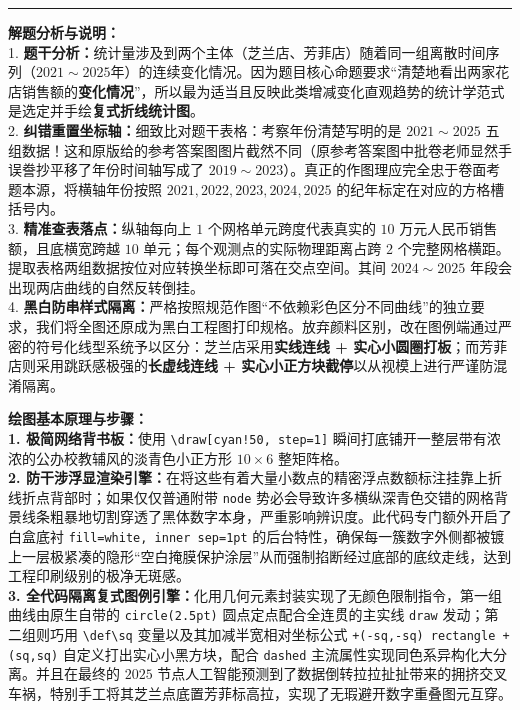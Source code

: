 \vspace{0.6cm}
\hrule
\vspace{0.4cm}

{\small\color{gray}
\textbf{解题分析与说明：}\\
1. \textbf{题干分析：}统计量涉及到两个主体（芝兰店、芳菲店）随着同一组离散时间序列（$2021\sim 2025$年）的连续变化情况。因为题目核心命题要求“清楚地看出两家花店销售额的\textbf{变化情况}”，所以最为适当且反映此类增减变化直观趋势的统计学范式是选定并手绘\textbf{复式折线统计图}。\\
2. \textbf{纠错重置坐标轴：}细致比对题干表格：考察年份清楚写明的是 $2021\sim 2025$ 五组数据！这和原版给的参考答案图图片截然不同（原参考答案图中批卷老师显然手误誊抄平移了年份时间轴写成了 $2019\sim 2023$）。真正的作图理应完全忠于卷面考题本源，将横轴年份按照 $2021, 2022, 2023, 2024, 2025$ 的纪年标定在对应的方格槽括号内。\\
3. \textbf{精准查表落点：}纵轴每向上 $1$ 个网格单元跨度代表真实的 $10$ 万元人民币销售额，且底横宽跨越 $10$ 单元；每个观测点的实际物理距离占跨 $2$ 个完整网格横距。提取表格两组数据按位对应转换坐标即可落在交点空间。其间 $2024\sim 2025$ 年段会出现两店曲线的自然反转倒挂。\\
4. \textbf{黑白防串样式隔离：}严格按照规范作图“不依赖彩色区分不同曲线”的独立要求，我们将全图还原成为黑白工程图打印规格。放弃颜料区别，改在图例端通过严密的符号化线型系统予以区分：芝兰店采用\textbf{实线连线 + 实心小圆圈打板}；而芳菲店则采用跳跃感极强的\textbf{长虚线连线 + 实心小正方块截停}以从视模上进行严谨防混淆隔离。
}

\vspace{0.6cm}

{\small\color{blue!70!black}
\textbf{绘图基本原理与步骤：}\\
\textbf{1. 极简网络背书板：}使用 \texttt{\textbackslash draw[cyan!50, step=1]} 瞬间打底铺开一整层带有浓浓的公办校教辅风的淡青色小正方形 $10\times 6$ 整矩阵格。\\
\textbf{2. 防干涉浮显渲染引擎：}在将这些有着大量小数点的精密浮点数额标注挂靠上折线折点背部时；如果仅仅普通附带 \texttt{node} 势必会导致许多横纵深青色交错的网格背景线条粗暴地切割穿透了黑体数字本身，严重影响辨识度。此代码专门额外开启了白盒底衬 \texttt{fill=white, inner sep=1pt} 的后台特性，确保每一簇数字外侧都被镀上一层极紧凑的隐形“空白掩膜保护涂层”从而强制掐断经过底部的底纹走线，达到工程印刷级别的极净无斑感。\\
\textbf{3. 全代码隔离复式图例引擎：}化用几何元素封装实现了无颜色限制指令，第一组曲线由原生自带的 \texttt{circle(2.5pt)} 圆点定点配合全连贯的主实线 \texttt{draw} 发动；第二组则巧用 \texttt{\textbackslash def\textbackslash sq} 变量以及其加减半宽相对坐标公式 \texttt{+(-sq,-sq) rectangle +(sq,sq)} 自定义打出实心小黑方块，配合 \texttt{dashed} 主流属性实现同色系异构化大分离。并且在最终的 $2025$ 节点人工智能预测到了数据倒转拉拉扯扯带来的拥挤交叉车祸，特别手工将其芝兰点底置芳菲标高拉，实现了无瑕避开数字重叠图元互穿。
}

